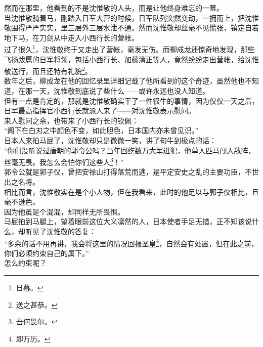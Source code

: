 \begin{multicols}{\theparacolNo}
然而在那里，他看到的不是沈惟敬的人头，而是让他终身难忘的一幕。\\

当沈惟敬骑着马，刚踏入日军大营的时候，日军队列突然变动，一拥而上，把沈惟敬围得严严实实，里三层外三层水泄不通。然而沈惟敬却丝毫不见慌张，镇定自若地下马，在刀剑从中走入小西行长的营帐。\\

过了很久\footnote{日暮。}，沈惟敬终于又走出了营帐，毫发无伤。而柳成龙还惊奇地发现，那些飞扬跋扈的日军将领，包括小西行长、加藤清正等人，竟然纷纷走出营帐，给沈惟敬送行，而且还特有礼貌\footnote{送之甚恭。}。\\

数年之后，柳成龙在他的回忆录里详细记载了他所看到的这个奇迹，虽然他也不知道，在那一天，沈惟敬到底说了些什么——或许永远也没人知道。\\

但有一点是肯定的，那就是沈惟敬确实干了一件很牛的事情，因为仅仅一天之后，日军最高指挥官小西行长就派人来了——对沈惟敬表示慰问。\\

来人慰问之余，也带来了小西行长的钦佩：\\

“阁下在白刃之中颜色不变，如此胆色，日本国内亦未曾见识。”\\

日本人来拍马屁了，沈惟敬却只是微微一笑，讲了句牛到极点的话：\\

“你们没听说过唐朝的郭令公吗？当年回纥数万大军进犯，他单人匹马闯入敌阵，丝毫无畏。我怎么会怕你们这些人\footnote{吾何畏尔。}！”\\

郭令公就是郭子仪，曾把安禄山打得落荒而逃，是平定安史之乱的主要功臣，不世出之名将。\\

相比而言，沈惟敬实在是个小人物，但在我看来，此时的他足以与郭子仪相比，且毫不逊色。\\

因为他虽是个混混，却同样无所畏惧。\\

马屁拍到马腿上，望着眼前这位大义凛然的人，日本使者手足无措，正不知该说什么，却听见了沈惟敬的答复：\\

“多余的话不用再讲，我会将这里的情况回报圣皇\footnote{即万历。}，自然会有处置，但在此之前，你们必须约束自己的属下。”\\

怎么约束呢？\\


\end{multicols}

